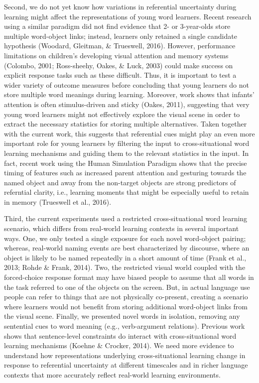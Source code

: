 \documentclass[authoryear, review]{elsarticle}
\begin{document}
Second, we do not yet know how variations in referential uncertainty
during learning might affect the representations of young word learners.
Recent research using a similar paradigm did not find evidence that 2-
or 3-year-olds store multiple word-object links; instead, learners only
retained a single candidate hypothesis (Woodard, Gleitman, \& Trueswell,
2016). However, performance limitations on children's developing visual
attention and memory systems (Colombo, 2001; Ross-sheehy, Oakes, \&
Luck, 2003) could make success on explicit response tasks such as these
difficult. Thus, it is important to test a wider variety of outcome
measures before concluding that young learners do not store multiple
word meanings during learning. Moreover, work shows that infants'
attention is often stimulus-driven and sticky (Oakes, 2011), suggesting
that very young word learners might not effectively explore the visual
scene in order to extract the necessary statistics for storing multiple
alternatives. Taken together with the current work, this suggests that
referential cues might play an even more important role for young
learners by filtering the input to cross-situational word learning
mechanisms and guiding them to the relevant statistics in the input. In
fact, recent work using the Human Simulation Paradigm shows that the
precise timing of features such as increased parent attention and
gesturing towards the named object and away from the non-target objects
are strong predictors of referntial clarity, i.e., learning moments that
might be especially useful to retain in memory (Trueswell et al., 2016).

Third, the current experiments used a restricted cross-situational word
learning scenario, which differs from real-world learning contexts in
several important ways. One, we only tested a single exposure for each
novel word-object pairing; whereas, real-world naming events are best
characterized by discourse, where an object is likely to be named
repeatedly in a short amount of time (Frank et al., 2013; Rohde \&
Frank, 2014). Two, the restricted visual world coupled with the
forced-choice response format may have biased people to assume that all
words in the task referred to one of the objects on the screen. But, in
actual language use people can refer to things that are not physically
co-present, creating a scenario where learners would not benefit from
storing additional word-object links from the visual scene. Finally, we
presented novel words in isolation, removing any sentential cues to word
meaning (e.g., verb-argument relations). Previous work shows that
sentence-level constraints do interact with cross-situational word
learning mechanisms (Koehne \& Crocker, 2014). We need more evidence to
understand how representations underlying cross-situational learning
change in response to referential uncertainty at different timescales
and in richer language contexts that more accurately reflect real-world
learning environments.
\end{document}
